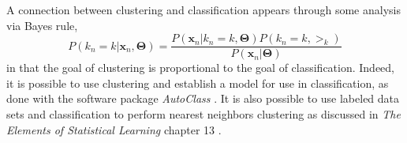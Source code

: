 A connection between clustering and classification appears through some analysis via Bayes rule,
\begin{equation}\label{Bayes}
 P(k_n=k|\bm x_n, \bm\Theta) =\dfrac{ P(\bm x_n|k_n=k,\bm\Theta)P(k_n=k, \bm\gt_k) }{P(\bm x_n|\bm\Theta)}
\end{equation}
in that the goal of clustering is proportional to the goal of classification.  Indeed, it is possible to use clustering and establish a model for use in classification, as done with the software package \textit{AutoClass} \cite{AutoClass1,AutoClass2}.  It is also possible to use labeled data sets and classification to perform nearest neighbors clustering as discussed in \textit{The Elements of Statistical Learning} chapter 13 \cite{hastie09esl}. 

